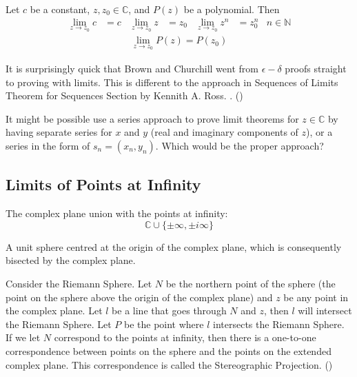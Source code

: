 \documentclass[12pt, english]{book}
\begin{document}
	\begin{corollary}
		\label{Limits of f=u+iv Theorem Corollary - Complex}
		Let $c$ be a constant, $z, z_0 \in \mathbb{C}$, and $P(z)$ be a polynomial. Then
		\begin{align*}
			\lim_{z \rightarrow z_0} c &= c & \lim_{z \rightarrow z_0} z &= z_0 &
			\lim_{z \rightarrow z_0} z^n &= z_0^n & n \in \mathbb{N}
		\end{align*}
		\begin{align*}
			\lim_{z \rightarrow z_0} P(z) = P(z_0)
		\end{align*}
	\end{corollary}

	\begin{observation}
		It is surprisingly quick that Brown and Churchill went from $\epsilon - \delta$ proofs straight to proving with limits. This is different to the approach in Sequences of Limits Theorem for Sequences Section by Kennith A. Ross. \cite{Ross.K-Elementary-Analysis-2013}. ()
	\end{observation}
	\begin{question}
		It might be possible use a series approach to prove limit theorems for $z \in \mathbb{C}$ by having separate series for $x$ and $y$ (real and imaginary components of $z$), or a series in the form of $s_n = (x_n, y_n)$. Which would be the proper approach?
	\end{question}
	
	\subsection{Limits of Points at Infinity} \label{Limits of Points at Infinity Subsection - Complex}
	
	\begin{definition}
		The complex plane union with the points at infinity: 
		$$\mathbb{C} \cup \{\pm \infty, \pm i \infty\}$$
	\end{definition}
	
	\begin{definition}
		A unit sphere centred at the origin of the complex plane, which is consequently bisected by the complex plane.
		\label{Riemann Sphere Definition - Complex}
	\end{definition}

	\begin{definition}
		Consider the Riemann Sphere. Let $N$ be the northern point of the sphere (the point on the sphere above the origin of the complex plane) and $z$ be any point in the complex plane. Let $l$ be a line that goes through $N$ and $z$, then $l$ will intersect the Riemann Sphere. Let $P$ be the point where $l$ intersects the Riemann Sphere. If we let $N$ correspond to the points at infinity, then there is a one-to-one correspondence between points on the sphere and the points on the extended complex plane. This correspondence is called the Stereographic Projection. ()
		\label{Stereographic Projection Definition - Complex}
	\end{definition}
\end{document}
